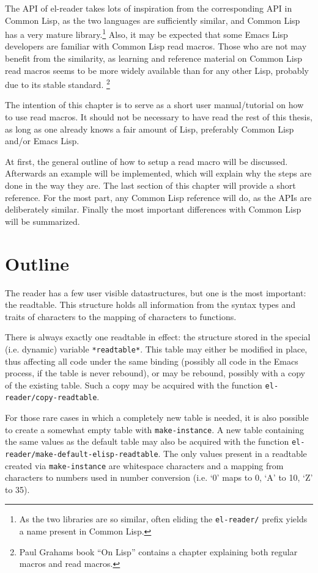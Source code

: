 \documentclass[a4paper,10pt,twoside]{report}
\newcommand{\el}{Emacs Lisp}
\newcommand{\cl}{Common Lisp}
\newcommand{\elr}{el-reader}
\newcommand{\sym}[1]{\texttt{#1}}
\newcommand{\fun}[1]{\texttt{#1}}
\begin{document}
The API of \elr{} takes lots of inspiration from the corresponding API in \cl{},
as the two languages are sufficiently similar, and \cl{} has a very mature
library.\footnote{As the two libraries are so similar, often eliding the
  \sym{el-reader/} prefix yields a name present in \cl{}.}  Also, it may be
expected that some \el{} developers are familiar with \cl{} read macros.  Those
who are not may benefit from the similarity, as learning and reference material
on \cl{} read macros seems to be more widely available than for any other Lisp,
probably due to its stable standard.  \footnote{Paul Grahams book ``On
  Lisp''\cite[p.~224]{on-lisp} contains a chapter explaining both regular macros
  and read macros.}

The intention of this chapter is to serve as a short user manual/tutorial on how
to use read macros.  It should not be necessary to have read the rest of this
thesis, as long as one already knows a fair amount of Lisp, preferably \cl{}
and/or \el{}.

At first, the general outline of how to setup a read macro will be discussed.
Afterwards an example will be implemented, which will explain why the steps are
done in the way they are.  The last section of this chapter will provide a short
reference.  For the most part, any \cl{} reference will do, as the APIs are
deliberately similar.  Finally the most important differences with \cl{} will be
summarized.

\section{Outline}
\label{sec:outline}

The reader has a few user visible datastructures, but one is the most important:
the readtable.  This structure holds all information from the syntax types and
traits of characters to the mapping of characters to functions.

There is always exactly one readtable in effect: the structure stored in the
special (i.e. dynamic) variable \sym{*readtable*}.  This table may either be
modified in place, thus affecting all code under the same binding (possibly all
code in the Emacs process, if the table is never rebound), or may be rebound,
possibly with a copy of the existing table.  Such a copy may be acquired with
the function \fun{el-reader/copy-readtable}.

For those rare cases in which a completely new table is needed, it is also
possible to create a somewhat empty table with \fun{make-instance}.  A new table
containing the same values as the default table may also be acquired with the
function \fun{el-reader/make-default-elisp-readtable}.  The only values present
in a readtable created via \fun{make-instance} are whitespace characters and a
mapping from characters to numbers used in number conversion (i.e. `0' maps to
0, `A' to 10, `Z' to 35).
\end{document}
